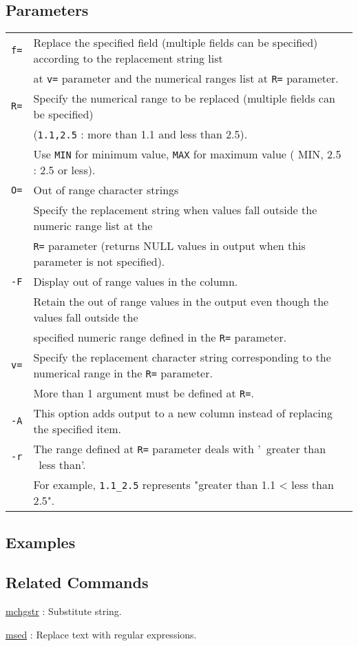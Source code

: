 \subsection*{Parameters}
\begin{table}[htbp]
{\small
\begin{tabular}{ll}
\verb|f=|    & Replace the specified field (multiple fields can be specified) according to the replacement string list \\
		& at \verb|v=| parameter and the numerical ranges list at \verb|R=| parameter. \\
\verb|R=|    & Specify the numerical range to be replaced (multiple fields can be specified) \\ 
		& (\verb|1.1,2.5| : more than 1.1 and less than 2.5).\\
             & Use \verb|MIN| for minimum value, \verb|MAX| for maximum value ( MIN, 2.5 : 2.5 or less).\\
\verb|O=|    & Out of range character strings\\
             & Specify the replacement string when values fall outside the numeric range list at the \\
             & \verb|R=| parameter (returns NULL values in output when this parameter is not specified). \\
\verb|-F|    & Display out of range values in the column. \\
		& Retain the out of range values in the output even though the values fall outside the \\
		& specified numeric range defined in the \verb|R=| parameter. \\
\verb|v=|    & Specify the replacement character string corresponding to the numerical range in the \verb|R=| parameter. \\
             & More than 1 argument must be defined at \verb|R=|.\\
\verb|-A|    & This option adds output to a new column instead of replacing the specified item.\\
\verb|-r|    & The range defined at \verb|R=| parameter deals with '~greater than ~less than'.\\
		& For example, \verb|1.1_2.5| represents "greater than 1.1 <  less than 2.5".\\

\end{tabular} 
}
\end{table} 

\subsection*{Examples}


\subsection*{Related Commands}

\hyperref[sect:mchgstr]{mchgstr} : Substitute string. 

\hyperref[sect:msed]{msed} : Replace text with regular expressions. 

%
